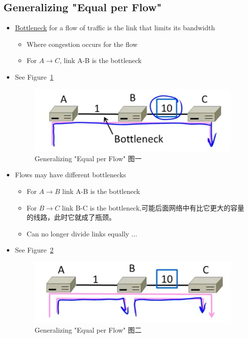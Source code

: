 \documentclass[12pt]{ctexart}   %
\begin{document}
	\subsection{Generalizing "Equal per Flow"}
	\begin{itemize}
		\item \underline{Bottleneck} for a flow of traffic is the link that limits its bandwidth
		\begin{itemize}
			\item Where congestion occurs for the flow
			\item For $A \rightarrow C$, link A-B is the bottleneck
		\end{itemize}
		\item See Figure~\ref{fig:7-2-4}
		  
		 \begin{figure}[h!] %
		\centering
		 \includegraphics[scale=0.7]{images/7-2-4}
		\caption{ Generalizing "Equal per Flow" 图一}
		 \label{fig:7-2-4}
		 \end{figure}
		 
		 \item Flows may have different bottlenecks
		 \begin{itemize}
		 	\item For $A \rightarrow B$ link A-B is the bottleneck
		 	\item For $B \rightarrow C$ link B-C is the bottleneck,可能后面网络中有比它更大的容量的线路，此时它就成了瓶颈。
		 	\item Can no longer divide links equally ...
		 \end{itemize}
		 \item See Figure~\ref{fig:7-2-5}
		  
		 \begin{figure}[h!] %
		\centering
		 \includegraphics[scale=0.7]{images/7-2-5}
		\caption{ Generalizing "Equal per Flow" 图二}
		 \label{fig:7-2-5}
		 \end{figure}
	\end{itemize}
	
\end{document}
